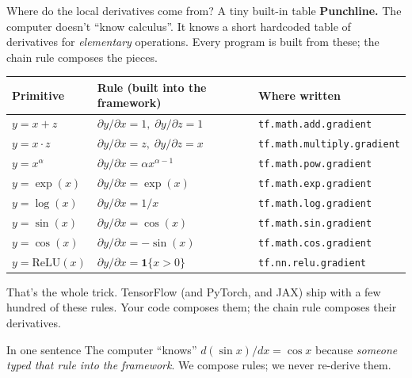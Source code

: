 \documentclass[aspectratio=169,11pt]{beamer}
\newcommand{\emphc}[1]{\textcolor{harvardcrimson}{#1}}
\begin{document}
\begin{frame}{Where do the local derivatives come from? A tiny built-in table}
\footnotesize
\textbf{Punchline.} The computer doesn't ``know calculus''. It knows a short \emphc{hardcoded table} of derivatives for \emph{elementary} operations. Every program is built from these; the chain rule composes the pieces.
\vspace{4pt}
\begin{center}
\renewcommand{\arraystretch}{1.15}
\begin{tabular}{p{3.0cm} p{3.0cm} p{5.8cm}}
\toprule
\textbf{Primitive} & \textbf{Rule (built into the framework)} & \textbf{Where written} \\
\midrule
$y = x + z$ & $\partial y/\partial x = 1,\; \partial y/\partial z = 1$ & \texttt{tf.math.add.gradient} \\
$y = x \cdot z$ & $\partial y/\partial x = z,\; \partial y/\partial z = x$ & \texttt{tf.math.multiply.gradient} \\
$y = x^{\alpha}$ & $\partial y/\partial x = \alpha x^{\alpha-1}$ & \texttt{tf.math.pow.gradient} \\
$y = \exp(x)$ & $\partial y/\partial x = \exp(x)$ & \texttt{tf.math.exp.gradient} \\
$y = \log(x)$ & $\partial y/\partial x = 1/x$ & \texttt{tf.math.log.gradient} \\
$y = \sin(x)$ & $\partial y/\partial x = \cos(x)$ & \texttt{tf.math.sin.gradient} \\
$y = \cos(x)$ & $\partial y/\partial x = -\sin(x)$ & \texttt{tf.math.cos.gradient} \\
$y = \mathrm{ReLU}(x)$ & $\partial y/\partial x = \mathbf{1}\{x > 0\}$ & \texttt{tf.nn.relu.gradient} \\
\bottomrule
\end{tabular}
\end{center}
\vspace{4pt}
That's the whole trick. TensorFlow (and PyTorch, and JAX) ship with a few hundred of these rules. Your code composes them; the chain rule composes their derivatives.
\vspace{4pt}
\begin{exampleblock}{In one sentence}
\footnotesize The computer ``knows'' $d(\sin x)/dx = \cos x$ because \emph{someone typed that rule into the framework}. We compose rules; we never re-derive them.
\end{exampleblock}
\end{frame}
\end{document}
